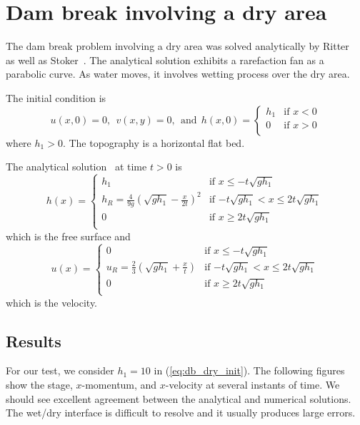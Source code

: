 
\section{Dam break involving a dry area}

The dam break problem involving a dry area was solved analytically by Ritter~\cite{Ritter1892} as well as Stoker~\cite{Stoker1948, Stoker1957}. The analytical solution exhibits a rarefaction fan as a parabolic curve. As water moves, it involves wetting process over the dry area.

The initial condition is
\begin{equation} \label{eq:db_dry_init}
u(x,0)=0, ~~v(x,y)=0, ~~\textrm{and}~~
h(x,0) = \left\{ \begin{array}{ll}
h_1 & \textrm{if $x < 0$}\\
0 & \textrm{if $x > 0$}\\
\end{array} \right.
\end{equation}
where $h_1>0$. The topography is a horizontal flat bed.


The analytical solution~\cite{Ritter1892, Stoker1948, Stoker1957} at time $t>0$ is
\begin{equation}
h(x) = \left\{ \begin{array}{ll}
h_1 & \textrm{if $x \leq -t \sqrt{gh_1}$}\\
h_R=\frac{4}{9g}(\sqrt{gh_1}-\frac{x}{2t})^2 & \textrm{if $-t \sqrt{gh_1} <x \leq 2t\sqrt{gh_1}$}\\
0 & \textrm{if $x \geq 2t\sqrt{gh_1}$}\\
\end{array} \right.
\end{equation}
which is the free surface and
\begin{equation}
u(x) = \left\{ \begin{array}{ll}
0 & \textrm{if $x \leq -t \sqrt{gh_1}$}\\
u_R=\frac{2}{3}(\sqrt{gh_1}+\frac{x}{t}) & \textrm{if $-t \sqrt{gh_1} <x \leq 2t\sqrt{gh_1}$}\\
0 & \textrm{if $x \geq 2t\sqrt{gh_1}$}\\
\end{array} \right.
\end{equation}
which is the velocity.



\subsection{Results}
For our test, we consider $h_1=10$ in (\ref{eq:db_dry_init}).
The following figures show the stage, $x$-momentum, and $x$-velocity at several instants of time. We should see excellent agreement between the analytical and numerical solutions. The wet/dry interface is difficult to resolve and it usually produces large errors.

